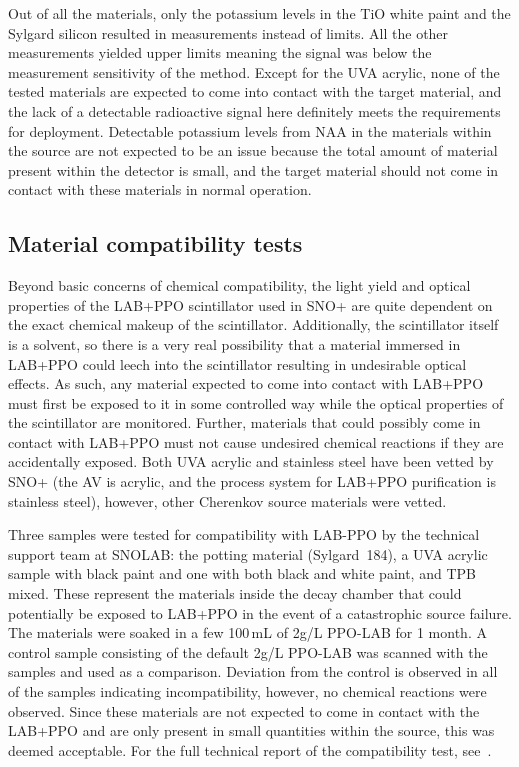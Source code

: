 Out of all the materials, only the potassium levels in the TiO white paint and the Sylgard silicon resulted in measurements instead of limits. 
All the other measurements yielded upper limits meaning the signal was below the measurement sensitivity of the method. 
Except for the UVA acrylic, none of the tested materials are expected to come into contact with the target material, and the lack of a detectable radioactive signal here definitely meets the requirements for deployment.
Detectable potassium levels from NAA in the materials within the source are not expected to be an issue because the total amount of material present within the detector is small, and the target material should not come in contact with these materials in normal operation.

\subsection{Material compatibility tests}
\label{sec:comptest}
Beyond basic concerns of chemical compatibility, the light yield and optical properties of the LAB+PPO scintillator used in SNO+ are quite dependent on the exact chemical makeup of the scintillator.
Additionally, the scintillator itself is a solvent, so there is a very real possibility that a material immersed in LAB+PPO could leech into the scintillator resulting in undesirable optical effects.
As such, any material expected to come into contact with LAB+PPO must first be exposed to it in some controlled way while the optical properties of the scintillator are monitored.
Further, materials that could possibly come in contact with LAB+PPO must not cause undesired chemical reactions if they are accidentally exposed.
Both UVA acrylic and stainless steel have been vetted by SNO+ (the AV is acrylic, and the process system for LAB+PPO purification is stainless steel), however, other Cherenkov source materials were vetted.

Three samples were tested for compatibility with LAB-PPO by the technical support team at SNOLAB: the potting material (Sylgard~184), a UVA acrylic sample with black paint and one with both black and white paint, and TPB mixed. 
These represent the materials inside the decay chamber that could potentially be exposed to LAB+PPO in the event of a catastrophic source failure.
The materials were soaked in a few 100\,mL of 2g/L PPO-LAB for 1 month. 
A control sample consisting of the default 2g/L PPO-LAB was scanned with the samples and used as a comparison. 
Deviation from the control is observed in all of the samples indicating incompatibility, however, no chemical reactions were observed.
Since these materials are not expected to come in contact with the LAB+PPO and are only present in small quantities within the source, this was deemed acceptable.
For the full technical report of the compatibility test, see~\cite{lina:2015}.


